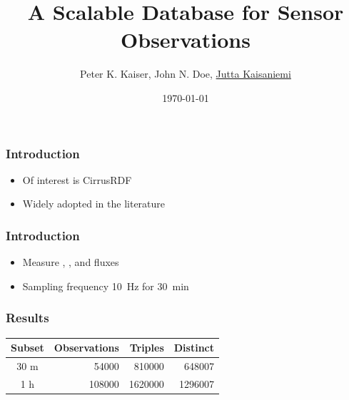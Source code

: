 \documentclass{beamer}
\title{A Scalable Database for Sensor Observations}
\author{Peter K. Kaiser, John N. Doe, \underline{Jutta Kaisaniemi}}
\date{\today}
\begin{document}
\maketitle

\begin{frame}
  \frametitle{Introduction}
  
  \begin{itemize}
  \item Of interest is CirrusRDF \cite{ladwig11cirrusrdf}
  \item Widely adopted in the literature \cite{phuoc11linked,lefort12qb}
  \end{itemize}
  
\end{frame}

\begin{frame}
  \frametitle{Introduction}
  
  \begin{itemize}
  \item Measure , , and  fluxes
  \item Sampling frequency \SI{10}{\hertz} for \SI{30}{\minute}
  \end{itemize}
  
\end{frame}

\begin{frame}
  \frametitle{Results}
  
	\centering
	\begin{tabular}{|c|r|r|r|}
		\hline
    Subset & Observations & Triples & Distinct \\
  	\hline
  	30 m & \num{54000} & \num{810000} & \num{648007} \\
  	1 h & \num{108000} & \num{1620000} & \num{1296007} \\
  	\hline 
  \end{tabular}
  
\end{frame}
\end{document}
